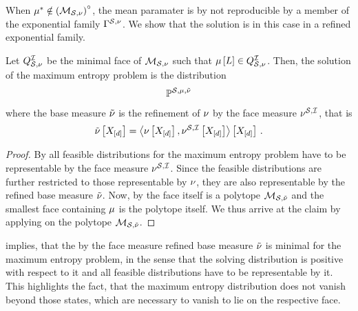 When $\mu^*\notin{\left(\mathcal{M}_{\mathcal{S},\nu}\right)}^{\circ}$, the mean paramater is by  not reproducible by a member of the exponential family $\Gamma^{\mathcal{S},\nu}$.
We show that the solution is in this case in a refined exponential family.

\begin{theorem}
    \label{the:maxEntropyFace}
    Let $Q^{\mathcal{I}}_{\mathcal{S},\nu}$ be the minimal face of $\mathcal{M}_{\mathcal{S},\nu}$ such that $\mu\left[L\right]\in Q^{\mathcal{I}}_{\mathcal{S},\nu}$.
    Then, the solution of the maximum entropy problem is the distribution
    \begin{align*}
        \mathbb{P}^{\mathcal{S},\mu,\tilde{\nu}}
    \end{align*}
    where the base measure $\tilde{\nu}$ is the refinement of $\nu$ by the face measure $\nu^{\mathcal{S},\mathcal{I}}$, that is
    \begin{align*}
        \tilde{\nu}\left[X_{[d]}\right] = \left\langle \nu\left[X_{[d]}\right],\nu^{\mathcal{S},\mathcal{I}}\left[X_{[d]}\right]\right\rangle \left[ X_{[d]} \right] \, .
    \end{align*}
\end{theorem}
\begin{proof}
    By  all feasible distributions for the maximum entropy problem have to be representable by the face measure $\nu^{\mathcal{S},\mathcal{I}}$.
    Since the feasible distributions are further restricted to those representable by $\nu$, they are also representable by the refined base measure $\tilde{\nu}$.
    Now, by  the face itself is a polytope $\mathcal{M}_{\mathcal{S},\tilde{\nu}}$ and the smallest face containing $\mu$ is the polytope itself.
    We thus arrive at the claim by applying  on the polytope $\mathcal{M}_{\mathcal{S},\tilde{\nu}}$.
\end{proof}

 implies, that the by the face measure refined base measure $\tilde{\nu}$ is minimal for the maximum entropy problem, in the sense that the solving distribution is positive with respect to it and all feasible distributions have to be representable by it.
This highlights the fact, that the maximum entropy distribution does not vanish beyond those states, which are necessary to vanish to lie on the respective face. %


